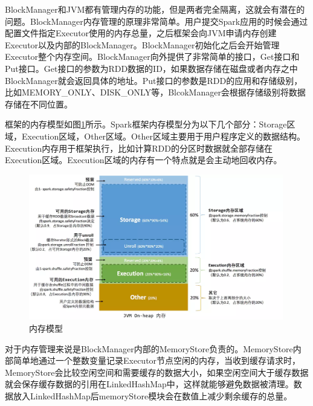 BlockManager和JVM都有管理内存的功能，但是两者完全隔离，这就会有潜在的问题。BlockManager内存管理的原理非常简单。用户提交Spark应用的时候会通过配置文件指定Executor使用的内存总量，之后框架会向JVM申请内存创建Executor以及内部的BlockManager。BlockManager初始化之后会开始管理Executor整个内存空间。BlockManager向外提供了非常简单的接口，Get接口和Put接口。Get接口的参数为RDD数据的ID，如果数据存储在磁盘或者内存之中BlockManager就会返回具体的地址。Put接口的参数是RDD的应用和存储级别，比如MEMORY\_ONLY、DISK\_ONLY等，BlcokManager会根据存储级别将数据存储在不同位置。

框架的内存模型如图\ref{fig:memory-model}所示。Spark框架内存模型分为以下几个部分：Storage区域，Execution区域，Other区域。Other区域主要用于用户程序定义的数据结构。Execution内存用于框架执行，比如计算RDD的分区时数据就全部存储在Execution区域。Execution区域的内存有一个特点就是会主动地回收内存。

\begin{figure}
    \centering
    \includegraphics[width=0.99\textwidth]{Img/memory-model.png}
    \caption{内存模型}
    \label{fig:memory-model}
\end{figure}

对于内存管理来说是BlockManager内部的MemoryStore负责的。MemoryStore内部简单地通过一个整数变量记录Executor节点空闲的内存，当收到缓存请求时，MemoryStore会比较空闲空间和需要缓存的数据大小，如果空闲空间大于缓存数据就会保存缓存数据的引用在LinkedHashMap中，这样就能够避免数据被清理。数据放入LinkedHashMap后memoryStore模块会在数值上减少剩余缓存的总量。

